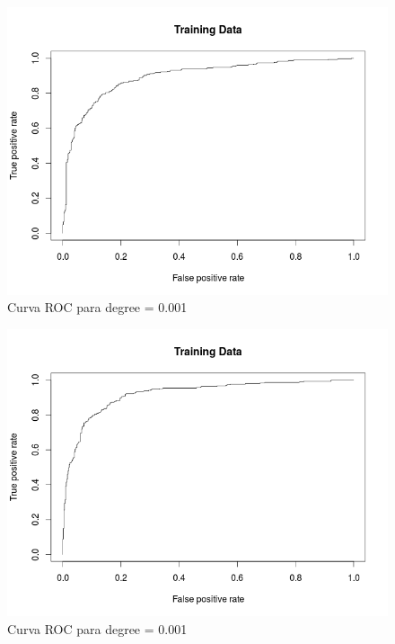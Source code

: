 \begin{figure}[H]
\centering
\includegraphics[scale=0.50]{ej1-6.png}
\caption{Curva ROC para degree = 0.001}
\label{}
\end{figure}

\begin{figure}[H]
\centering
\includegraphics[scale=0.50]{ej1-62.png}
\caption{Curva ROC para degree = 0.001}
\label{}
\end{figure}

